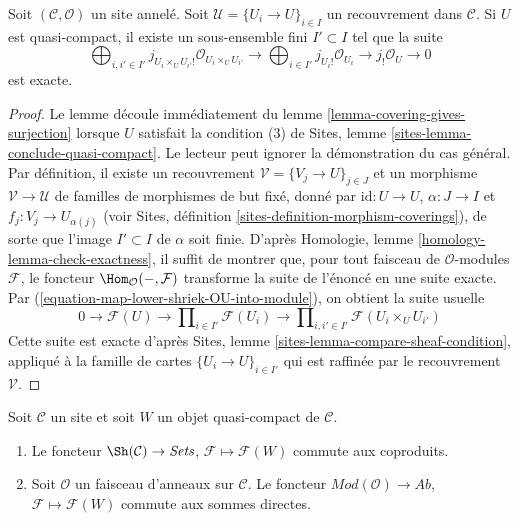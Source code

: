 \begin{lemma}

\label{lemma-silly-quasi-compact}
Soit $(\mathcal{C}, \mathcal{O})$ un site annelé. Soit
$\mathcal{U} = \{U_i \to U\}_{i \in I}$ un recouvrement dans
$\mathcal{C}$. Si $U$ est quasi-compact, il existe un sous-ensemble fini
$I' \subset I$ tel que la suite
$$
\bigoplus\nolimits_{i, i' \in I'}
j_{U_i \times_U U_{i'}!}\mathcal{O}_{U_i \times_U U_{i'}} \to
\bigoplus\nolimits_{i \in I'}
j_{U_i!}\mathcal{O}_{U_i} \to
j_!\mathcal{O}_U \to 0
$$ est exacte.
\end{lemma}

\begin{proof}

Le lemme découle immédiatement du lemme
\ref{lemma-covering-gives-surjection} lorsque $U$ satisfait la condition
(3) de Sites, lemme \ref{sites-lemma-conclude-quasi-compact}. Le lecteur
peut ignorer la démonstration du cas général. Par définition, il existe un
recouvrement
$\mathcal{V} = \{V_j \to U\}_{j \in J}$ et un morphisme
$\mathcal{V} \to \mathcal{U}$ de familles de morphismes de but fixé, donné
par $\text{id} : U \to U$, $\alpha : J \to I$ et
$f_j : V_j \to U_{\alpha(j)}$
(voir Sites, définition \ref{sites-definition-morphism-coverings}), de sorte
que l'image $I' \subset I$ de $\alpha$ soit finie. D'après Homologie, lemme
\ref{homology-lemma-check-exactness}, il suffit de montrer que, pour tout
faisceau de $\mathcal{O}$-modules $\mathcal{F}$, le foncteur
$\Hom_\mathcal{O}(-, \mathcal{F})$ transforme la suite de l'énoncé en une
suite exacte. Par (\ref{equation-map-lower-shriek-OU-into-module}), on
obtient la suite usuelle
$$
0 \to
\mathcal{F}(U) \to
\prod\nolimits_{i \in I'} \mathcal{F}(U_i) \to
\prod\nolimits_{i, i' \in I'} \mathcal{F}(U_i \times_U U_{i'})
$$
Cette suite est exacte d'après Sites, lemme
\ref{sites-lemma-compare-sheaf-condition},
appliqué à la famille de cartes $\{U_i \to U\}_{i \in I'}$
qui est raffinée par le recouvrement $\mathcal{V}$.

\end{proof}

\begin{lemma}

\label{lemma-sections-over-quasi-compact}
Soit $\mathcal{C}$ un site et soit $W$ un objet quasi-compact de
$\mathcal{C}$.
\begin{enumerate}
\item Le foncteur $\Sh(\mathcal{C}) \to \textit{Sets}$,
$\mathcal{F} \mapsto \mathcal{F}(W)$ commute aux coproduits.
\item Soit $\mathcal{O}$ un faisceau d'anneaux sur $\mathcal{C}$. Le
foncteur $\textit{Mod}(\mathcal{O}) \to \textit{Ab}$,
$\mathcal{F} \mapsto \mathcal{F}(W)$ commute aux sommes directes.
\end{enumerate}

\end{lemma}

